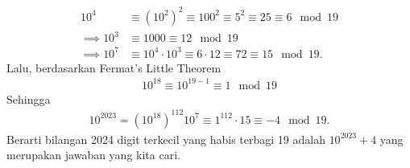 \begin{solusi}
    \begin{align*}
        10^4 &\equiv (10^2)^2 \equiv 100^2 \equiv 5^2 \equiv 25 \equiv 6 \mod 19\\
        \implies 10^3 &\equiv 1000 \equiv 12 \mod 19\\
        \implies 10^7 &\equiv 10^4\cdot 10^3 \equiv 6 \cdot 12 \equiv 72 \equiv 15 \mod 19.
    \end{align*}
    Lalu, berdasarkan Fermat's Little Theorem
    \begin{align*}
        10^{18} \equiv 10^{19-1} \equiv 1 \mod 19
    \end{align*}
    Sehingga
    \begin{align*}
        10^{2023} = (10^{18})^{112}10^7 \equiv 1^{112} \cdot 15 \equiv -4 \mod 19.
    \end{align*}
    Berarti bilangan 2024 digit terkecil yang habis terbagi 19 adalah $10^{2023} + 4$ yang merupakan jawaban yang kita cari.
\end{solusi}